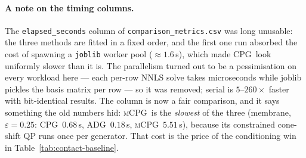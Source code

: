 \documentclass[11pt]{article}
\newcommand{\CPG}{\textsc{CPG}}
\newcommand{\ADG}{\textsc{ADG}}
\newcommand{\mCPG}{\textsc{mCPG}}
\begin{document}
\paragraph{A note on the timing columns.}
The \texttt{elapsed\_seconds} column of \texttt{comparison\_metrics.csv} was
long unusable: the three methods are fitted in a fixed order, and the first one
run absorbed the cost of spawning a \texttt{joblib} worker pool
($\approx1.6$\,s), which made \CPG\ look uniformly slower than it is. The
parallelism turned out to be a pessimisation on every workload here --- each
per-row NNLS solve takes microseconds while joblib pickles the basis matrix per
row --- so it was removed; serial is $5$--$260\times$ faster with bit-identical
results. The column is now a fair comparison, and it says something the old
numbers hid: \mCPG\ is the \emph{slowest} of the three (membrane, $\varepsilon=0.25$:
\CPG\ $0.68$\,s, \ADG\ $0.18$\,s, \mCPG\ $5.51$\,s), because its constrained
cone-shift QP runs once per generator. That cost is the price of the
conditioning win in Table~\ref{tab:contact-baseline}.
\end{document}

